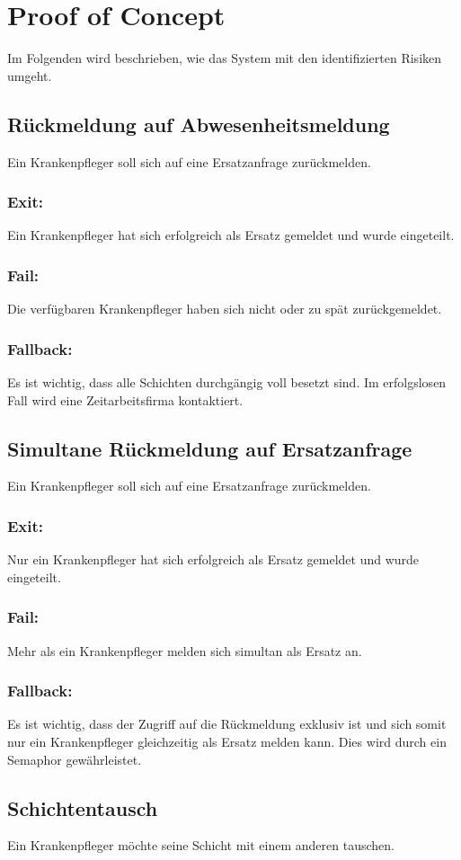 \documentclass[10pt,a4paper]{article}
\begin{document}
\section{Proof of Concept}
Im Folgenden wird beschrieben, wie das System mit den identifizierten Risiken umgeht.
\subsection{Rückmeldung auf Abwesenheitsmeldung}
Ein Krankenpfleger soll sich auf eine Ersatzanfrage zurückmelden.
\subsubsection{Exit:}
Ein Krankenpfleger hat sich erfolgreich als Ersatz gemeldet und wurde eingeteilt.
\subsubsection{Fail:}
Die verfügbaren Krankenpfleger haben sich nicht oder zu spät zurückgemeldet.
\subsubsection{Fallback:}
Es ist wichtig, dass alle Schichten durchgängig voll besetzt sind. Im erfolgslosen Fall wird eine Zeitarbeitsfirma kontaktiert.
\subsection{Simultane Rückmeldung auf Ersatzanfrage}
Ein Krankenpfleger soll sich auf eine Ersatzanfrage zurückmelden.
\subsubsection{Exit:}
Nur ein Krankenpfleger hat sich erfolgreich als Ersatz gemeldet und wurde eingeteilt.
\subsubsection{Fail:}
Mehr als ein Krankenpfleger melden sich simultan als Ersatz an.
\subsubsection{Fallback:}
Es ist wichtig, dass der Zugriff auf die Rückmeldung exklusiv ist und sich somit nur ein Krankenpfleger gleichzeitig als Ersatz melden kann. Dies wird durch ein Semaphor gewährleistet.
\subsection{Schichtentausch}
Ein Krankenpfleger möchte seine Schicht mit einem anderen tauschen.
\end{document}
